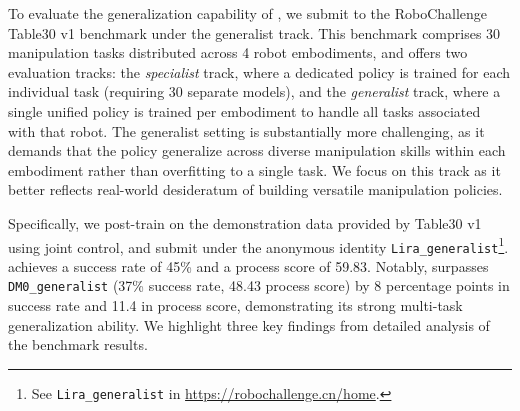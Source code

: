 To evaluate the generalization capability of \ours, we submit to the RoboChallenge Table30 v1 benchmark under the generalist track. This benchmark comprises 30 manipulation tasks distributed across 4 robot embodiments, and offers two evaluation tracks: the \textit{specialist} track, where a dedicated policy is trained for each individual task (requiring 30 separate models), and the \textit{generalist} track, where a single unified policy is trained per embodiment to handle all tasks associated with that robot. The generalist setting is substantially more challenging, as it demands that the policy generalize across diverse manipulation skills within each embodiment rather than overfitting to a single task. We focus on this track as it better reflects real-world desideratum of building versatile manipulation policies.

Specifically, we post-train \ours on the demonstration data provided by Table30 v1 using joint control, and submit under the anonymous identity \texttt{Lira\_generalist}\footnote{See \texttt{Lira\_generalist} in \url{https://robochallenge.cn/home}.}. \ours achieves a success rate of 45\% and a process score of 59.83. Notably, \ours surpasses \texttt{DM0\_generalist} (37\% success rate, 48.43 process score) by 8 percentage points in success rate and 11.4 in process score, demonstrating its strong multi-task generalization ability. We highlight three key findings from detailed analysis of the benchmark results.

